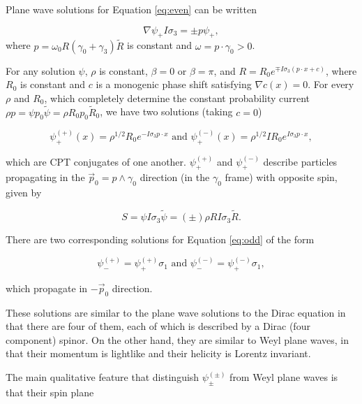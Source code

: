 \documentclass[twocolumn]{article}
\begin{document}
  Plane wave solutions for Equation \ref{eq:even} can be written

  \begin{equation}
    \nabla \psi_+ I \sigma_3 = \pm p \psi_+,\label{eq:plane}
  \end{equation}
  where $p = \omega_0 R (\gamma_0 + \gamma_3) \widetilde R$ is constant and $\omega = p \cdot \gamma_0 > 0$.

  For any solution $\psi$, $\rho$ is constant, $\beta = 0$ or $\beta = \pi$, and $R = R_0 e^{\mp I \sigma_3 (p \cdot x + c)}$, where $R_0$ is constant and $c$ is a monogenic phase shift satisfying $\nabla c(x) = 0$. For every $\rho$ and $R_0$, which completely determine the constant probability current $\rho p = \psi p_0 \widetilde \psi = \rho R_0 p_0 \widetilde R_0$, we have two solutions (taking $c = 0$)

  \begin{equation}
    \psi^{(+)}_+(x) = \rho^{1/2} R_0 e^{- I \sigma_3 p \cdot x} \text { and } \psi^{(-)}_+(x) = \rho^{1/2} I R_0 e^{I \sigma_3 p \cdot x},
  \end{equation} 

  which are CPT conjugates of one another. $\psi^{(+)}_+$ and $\psi^{(-)}_+$ describe particles propagating in the $\vec p_0 = p \wedge \gamma_0$ direction (in the $\gamma_0$ frame) with opposite spin, given by 

  \begin{equation}
    S = \psi I \sigma_3 \widetilde \psi = (\pm)\rho R I \sigma_3 \widetilde R.
  \end{equation}

  There are two corresponding solutions for Equation \ref{eq:odd} of the form

  \begin{equation}
    \psi^{(+)}_- = \psi^{(+)}_+ \sigma_1 \text{ and }
    \psi^{(-)}_- = \psi^{(-)}_+ \sigma_1,
  \end{equation}

  which propagate in $-\vec p_0$ direction.

  These solutions are similar to the plane wave solutions to the Dirac equation in that there are four of them, each of which is described by a Dirac (four component) spinor. On the other hand, they are similar to Weyl plane waves, in that their momentum is lightlike and their helicity is Lorentz invariant.

  The main qualitative feature that distinguish $\psi^{(\pm)}_{\pm}$ from Weyl plane waves is that their spin plane 
\end{document}
